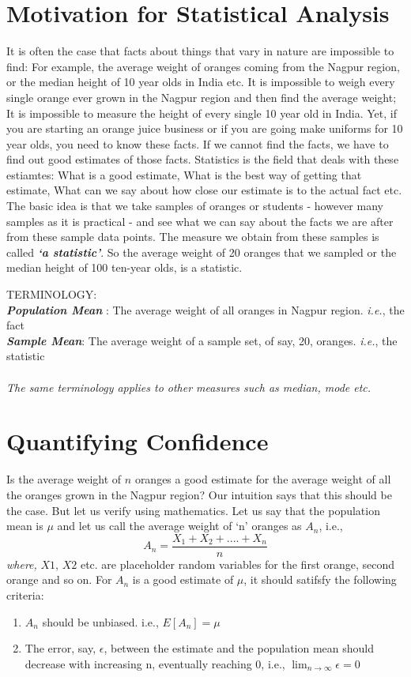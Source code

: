 \section{Motivation for Statistical Analysis}
It is often the case that facts about things that vary in nature are impossible to find: For example, the average weight of oranges coming from the Nagpur region, or the median height of 10 year olds in India etc. It is impossible to weigh every single orange ever grown in the Nagpur region and then find the average weight; It is impossible to measure the height of every single 10 year old in India. Yet, if you are starting an orange juice business or if you are going make uniforms for 10 year olds, you need to know these facts. If we cannot find the facts, we have to find out good estimates of those facts. Statistics is the field that deals with these estiamtes: What is a good estimate, What is the best way of getting that estimate, What can we say about how close our estimate is to the actual fact etc. The basic idea is that we take samples of oranges or students - however many samples as it is practical - and see what we can say about the facts we are after from these sample data points. The measure we obtain from these samples is called \textbf{\emph{`a statistic'}}. So the average weight of 20 oranges that we sampled or the median height of 100 ten-year olds, is a statistic. \\ 

	\begin{highlightedText}
		TERMINOLOGY: \\
		\emph{\textbf{Population Mean}} :  The average weight of all oranges in Nagpur region. \emph{i.e.}, the fact\\
		\emph{\textbf{Sample Mean}}:  The average weight of a sample set, of say, 20, oranges. \emph{i.e.}, the statistic \\ \\
		\emph{The same terminology applies to other measures such as median, mode etc.}
	\end{highlightedText}
	
\section{Quantifying Confidence}
Is the average weight of $n$ oranges a good estimate for the average weight of all the oranges grown in the Nagpur region? Our intuition says that this should be the case. But let us verify using mathematics. Let us say that the population mean is $\mu$ and let us call the average weight of `n' oranges as $A_n$, i.e., \[A_n = \frac{X_1+X_2+....+X_n}{n} \] \emph{where,} $X1$, $X2$ etc. are placeholder random variables for the first orange, second orange and so on. For $A_n$ is a good estimate of $\mu$, it should satifsfy the following criteria:
\begin{enumerate}
	\item $A_n$ should be unbiased. i.e., $E[A_n] = \mu $
	\item The error, say, $\epsilon$, between the estimate and the population mean should decrease with increasing n, eventually reaching 0, i.e., $\lim_{n\to\infty} \epsilon = 0 $
\end{enumerate}


